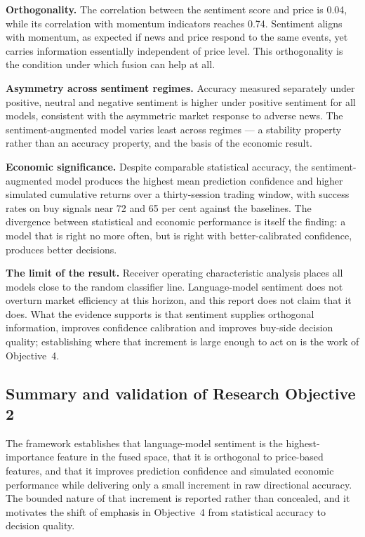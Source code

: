 \textbf{Orthogonality.} The correlation between the sentiment score and price is 0.04,
while its correlation with momentum indicators reaches 0.74. Sentiment aligns with
momentum, as expected if news and price respond to the same events, yet carries
information essentially independent of price level. This orthogonality is the condition
under which fusion can help at all.

\textbf{Asymmetry across sentiment regimes.} Accuracy measured separately under positive,
neutral and negative sentiment is higher under positive sentiment for all models,
consistent with the asymmetric market response to adverse news. The sentiment-augmented
model varies least across regimes --- a stability property rather than an accuracy
property, and the basis of the economic result.

\textbf{Economic significance.} Despite comparable statistical accuracy, the
sentiment-augmented model produces the highest mean prediction confidence and higher
simulated cumulative returns over a thirty-session trading window, with success rates on
buy signals near 72 and 65 per cent against the baselines. The divergence between
statistical and economic performance is itself the finding: a model that is right no more
often, but is right with better-calibrated confidence, produces better decisions.

\textbf{The limit of the result.} Receiver operating characteristic analysis places all
models close to the random classifier line. Language-model sentiment does not overturn
market efficiency at this horizon, and this report does not claim that it does. What the
evidence supports is that sentiment supplies orthogonal information, improves confidence
calibration and improves buy-side decision quality; establishing where that increment is
large enough to act on is the work of Objective~4.

\subsection{Summary and validation of Research Objective 2}

The framework establishes that language-model sentiment is the highest-importance feature
in the fused space, that it is orthogonal to price-based features, and that it improves
prediction confidence and simulated economic performance while delivering only a small
increment in raw directional accuracy. The bounded nature of that increment is reported
rather than concealed, and it motivates the shift of emphasis in Objective~4 from
statistical accuracy to decision quality.

